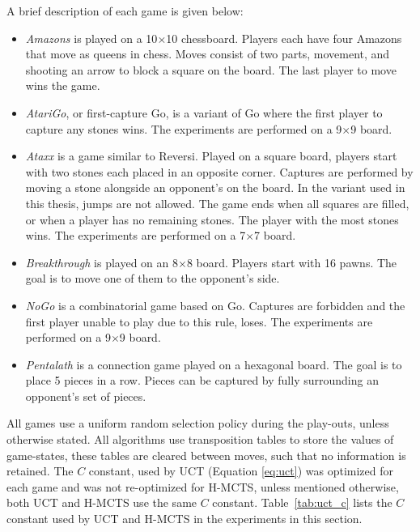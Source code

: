 \documentclass{kecsmstr}
\begin{document}
A brief description of each game is given below:
\begin{itemize}
\item \emph{Amazons} is played on a 10$\times$10 chessboard. Players each have four Amazons that move as queens in chess. Moves consist of two parts, movement, and shooting an arrow to block a square on the board. The last player to move wins the game.
\item \emph{AtariGo}, or first-capture Go, is a variant of Go where the first player to capture any stones wins. The experiments are performed on a 9$\times$9 board.
\item \emph{Ataxx} is a game similar to Reversi. Played on a square board, players start with two stones each placed in an opposite corner. Captures are performed by moving a stone alongside an opponent's on the board. In the variant used in this thesis, jumps are not allowed. The game ends when all squares are filled, or when a player has no remaining stones. The player with the most stones wins.  The experiments are performed on a 7$\times$7 board.
\item \emph{Breakthrough} is played on an 8$\times$8 board. Players start with 16 pawns. The goal is to move one of them to the opponent's side.
\item \emph{NoGo} is a combinatorial game based on Go. Captures are forbidden and the first player unable to play due to this rule, loses. The experiments are performed on a 9$\times$9 board.
\item \emph{Pentalath} is a connection game played on a hexagonal board. The goal is to place 5 pieces in a row. Pieces can be captured by fully surrounding an opponent's set of pieces.
\end{itemize}

All games use a uniform random selection policy during the play-outs, unless otherwise stated. All algorithms use transposition tables to store the values of game-states, these tables are cleared between moves, such that no information is retained. The $C$ constant, used by UCT (Equation \ref{eq:uct}) was optimized for each game and was not re-optimized for H-MCTS, unless mentioned otherwise, both UCT and H-MCTS use the same $C$ constant. Table~\ref{tab:uct_c} lists the $C$ constant used by UCT and H-MCTS in the experiments in this section.
\end{document}
